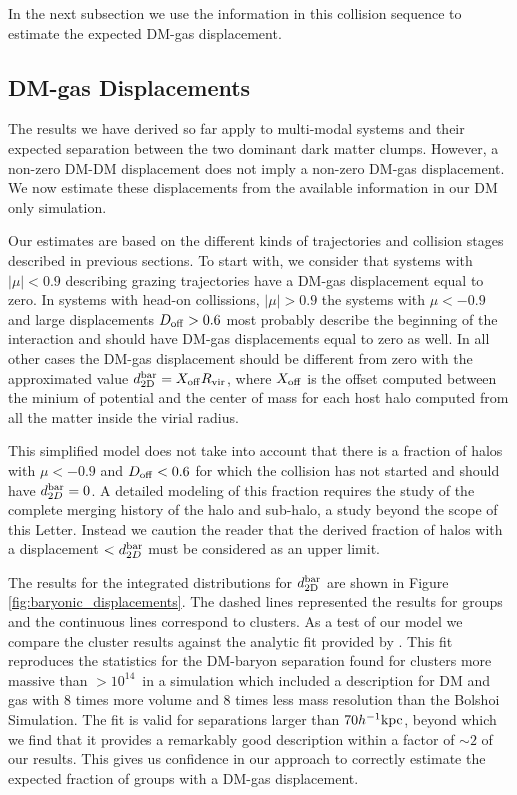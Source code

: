 \documentclass{emulateapj}
\newcommand{\hkpc}{{\ifmmode{h^{-1}{\rm kpc}}\else{$h^{-1}$kpc }\fi}}
\newcommand{\hMsun}{{\ifmmode{h^{-1}{\rm {M_{\odot}}}}\else{$h^{-1}{\rm{M_{\odot}}}$}\fi}}
\begin{document}
In the next subsection we use the information in this collision
sequence to estimate the expected DM-gas displacement. 

\subsection{DM-gas Displacements}
\label{sec:baryonic_displacements}

The results we have derived so far apply to multi-modal systems and
their expected separation between the two dominant dark matter
clumps. However, a non-zero DM-DM displacement does not imply 
a non-zero DM-gas displacement. We now estimate these displacements
from the available information in our DM only simulation.

Our estimates are based on the different kinds of trajectories and
collision stages described in previous sections. To start with, we
consider that systems with $|\mu|<0.9$ describing grazing
trajectories have a DM-gas displacement equal to zero.  In systems
with head-on collissions, $|\mu|>0.9$ the systems with $\mu<-0.9$ and
large displacements $D_{\rm   off}>0.6$ most probably describe the
beginning of the interaction and should have DM-gas displacements
equal to zero as well. In all other cases the DM-gas displacement
should be different from zero with the approximated value
$d_{\rm   2D}^{\rm bar} = X_{\rm off} R_{\rm   vir}$, where $X_{\rm   off}$ is
the offset computed between the minium of potential and the center of
mass for each host halo computed from all the matter inside the virial
radius.   


This simplified model does not take into account that there is a
fraction of halos with $\mu<-0.9$ and $D_{\rm off}<0.6$ for which the
collision has not started and should have $d_{2D}^{\rm bar}=0$. A detailed
modeling of this fraction requires the study of the complete merging
history  of the halo and sub-halo, a study beyond the scope of this
Letter. Instead we caution the reader that the derived fraction of
halos with a displacement $<d_{2D}^{\rm bar}$ must be considered as an
upper limit. 

The results for the integrated distributions for $d_{\rm 2D}^{\rm bar}$
are shown in Figure \ref{fig:baryonic_displacements}. The dashed lines
represented the results for groups and the continuous lines correspond
to clusters. As a test of our model we compare the cluster results
against the analytic fit provided by \cite{ForeroRomero2010}. This fit
reproduces the statistics for the DM-baryon separation found for
clusters more massive than $>10^{14}$\hMsun\ in a simulation
which included a description for DM and gas with $8$ times more volume
and $8$ times less mass resolution than the Bolshoi Simulation. The
fit is valid for separations larger than $70\hkpc$, beyond which we
find that it provides a remarkably good description within a factor of
$\sim 2$ of our results. This gives us confidence in our approach to
correctly estimate the expected fraction of groups with a DM-gas
displacement. 
\end{document}
